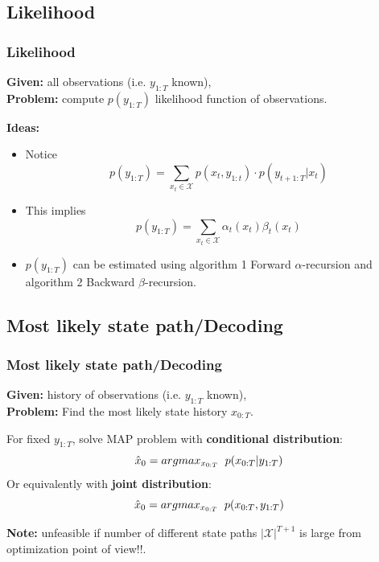 \documentclass[xcolor=dvipsnames, compress]{beamer}
\begin{document}
\begin{frame}
\section{Likelihood}
\frametitle{Likelihood}

\textbf{Given:} all observations (i.e. $y_{1:T}$ known),\\
\textbf{Problem:} compute $p(y_{1:T})$ likelihood function of observations.

\vspace{0.5cm}

\textbf{Ideas:}

\begin{itemize}
	\item Notice $$p(y_{1:T} ) = \sum_{x_t \in \mathcal{X}} p(x_t , y_{1:t} ) \cdot p(y_{t+1:T} |x_t )$$
	\item This implies $$p(y_{1:T} ) = \sum_{x_t \in \mathcal{X}} \alpha_t(x_t) \beta_t(x_t) $$
	
	\item $p(y_{1:T} )$ can be estimated using algorithm 1 Forward $\alpha$-recursion and algorithm 2 Backward $\beta$-recursion.
	
\end{itemize}

\end{frame}

\begin{frame}
\section{Most likely state path/Decoding}
\frametitle{Most likely state path/Decoding}

\textbf{Given:} history of observations (i.e. $y_{1:T}$ known),\\
\textbf{Problem:} Find the most likely state history $x_{0:T}$.

\vspace{0.5cm}

For fixed $y_{1:T}$, solve MAP problem with \textbf{conditional distribution}:
\begin{equation*}
\hat{x}_0 = argmax_{x_{0:T}} \hspace{0.2cm} p(x_{0:T}| y_{1:T}) 
\end{equation*}
Or equivalently with \textbf{joint distribution}:
\begin{equation*}
\hat{x}_0 = argmax_{x_{0:T}} \hspace{0.2cm} p(x_{0:T}, y_{1:T})
\end{equation*}

\textbf{Note:} unfeasible if number of different state paths $|\mathcal{X}|^{T+1}$ is large from optimization point of view!!.

\end{frame}
\end{document}
